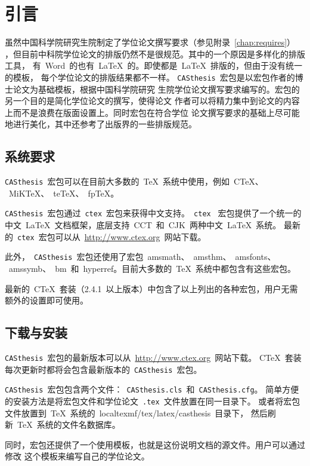 ﻿
\chapter{引言}
\label{chap:introduction}

虽然中国科学院研究生院制定了学位论文撰写要求（参见附录~\ref{chap:requires}）
，但目前中科院学位论文的排版仍然不是很规范。其中的一个原因是多样化的排版工具，
有~Word~的也有~\LaTeX{}~的。即使都是~\LaTeX{}~排版的，但由于没有统一的模板，
每个学位论文的排版结果都不一样。
\texttt{CASthesis}~宏包是以宏包作者的博士论文为基础模板，根据中国科学院研究
生院学位论文撰写要求编写的。宏包的另一个目的是简化学位论文的撰写，使得论文
作者可以将精力集中到论文的内容上而不是浪费在版面设置上。同时宏包在符合学位
论文撰写要求的基础上尽可能地进行美化，其中还参考了出版界的一些排版规范。

\section{系统要求}

\texttt{CASthesis}~宏包可以在目前大多数的~\TeX{}~系统中使用，例如~C\TeX{}、
~MiK\TeX{}、~te\TeX{}、~fp\TeX{}。

\texttt{CASthesis}~宏包通过~\texttt{ctex}~宏包来获得中文支持。~\texttt{ctex}~
宏包提供了一个统一的中文~\LaTeX{}~文档框架，底层支持~CCT~和~CJK~两种中文~\LaTeX{}~系统。
最新的~\texttt{ctex}~宏包可以从~\url{http://www.ctex.org}~网站下载。

此外，~\texttt{CASthesis}~宏包还使用了宏包~amsmath、~amsthm、~amsfonts、
~amssymb、~bm~和~hyperref。目前大多数的~\TeX{}~系统中都包含有这些宏包。

最新的~C\TeX{}~套装（2.4.1~以上版本）中包含了以上列出的各种宏包，用户无需额外的设置即可使用。

\section{下载与安装}

\texttt{CASthesis}~宏包的最新版本可以从~\url{http://www.ctex.org}~网站下载。
C\TeX{}~套装每次更新时都将会包含最新版本的~\texttt{CASthesis}~宏包。

\texttt{CASthesis}~宏包包含两个文件：~\texttt{CASthesis.cls}~和~\texttt{CASthesis.cfg}。
简单方便的安装方法是将宏包文件和学位论文~\texttt{.tex}~文件放置在同一目录下。
或者将宏包文件放置到~\TeX{}~系统的~localtexmf/tex/latex/casthesis~目录下，
然后刷新~\TeX{}~系统的文件名数据库。

同时，宏包还提供了一个使用模板，也就是这份说明文档的源文件。用户可以通过修改
这个模板来编写自己的学位论文。

